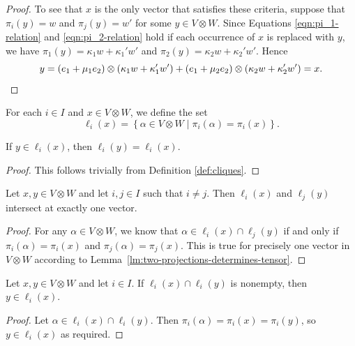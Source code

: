 \documentclass[ALCO, Unicode]{cedram}
\begin{document}
\begin{proof}
To see that $x$ is the only vector that satisfies these criteria, suppose that $\pi_i{\left(y \right)} = w$ and $\pi_j{\left(y \right)} = w'$ for some $y \in V \otimes W$. Since Equations \eqref{eqn:pi_1-relation} and \eqref{eqn:pi_2-relation} hold if each occurrence of $x$ is replaced with $y$, we have $\pi_1{\left(y \right)} = \kappa_1 w + \kappa_1' w'$ and $\pi_2{\left(y \right)} = \kappa_2 w + \kappa_2' w'$. Hence
\begin{displaymath}
    y = \left(e_1 + \mu_1 e_2 \right) \otimes \left(\kappa_1 w + \kappa_1' w' \right) + \left(e_1 + \mu_2 e_2 \right) \otimes \left(\kappa_2 w + \kappa_2' w' \right) = x.\qedhere
\end{displaymath}
\end{proof}

\begin{defi} \label{def:cliques}
For each $i \in I$ and $x \in V \otimes W$, we define the set
\begin{displaymath}
    \ell_i{\left(x \right)} = {\left\{\alpha \in V \otimes W \mid \pi_i{\left(\alpha \right)} = \pi_i{\left(x \right)}\right\}}.
\end{displaymath}
\end{defi}

\begin{lemma} \label{lm:clique-equivalence}
If $y \in \ell_i{\left(x \right)}$, then $\ell_i{\left(y \right)} = \ell_i{\left(x \right)}$.
\end{lemma}
\begin{proof}
This follows trivially from Definition \ref{def:cliques}.
\end{proof}

\begin{lemma} \label{lm:clique-intersection}
Let $x, y \in V \otimes W$ and let $i, j \in I$ such that $i \neq j$. Then $\ell_i{\left(x \right)}$ and $\ell_j{\left(y \right)}$ intersect at exactly one vector.
\end{lemma}
\begin{proof}
For any $\alpha \in V \otimes W$, we know that $\alpha \in \ell_i{\left(x \right)} \cap \ell_j{\left(y \right)}$ if and only if $\pi_i{\left(\alpha \right)} = \pi_i{\left(x \right)}$ and $\pi_j{\left(\alpha \right)} = \pi_j{\left(x \right)}$. This is true for precisely one vector in $V \otimes W$ according to Lemma~\ref{lm:two-projections-determines-tensor}.
\end{proof}

\begin{lemma} \label{lm:parallel-cliques}
Let $x, y \in V \otimes W$ and let $i \in I$. If $\ell_i{\left(x \right)} \cap \ell_i{\left(y \right)}$ is nonempty, then $y \in \ell_i{\left(x \right)}$.
\end{lemma}
\begin{proof}
Let $\alpha \in \ell_i{\left(x \right)} \cap \ell_i{\left(y \right)}$. Then $\pi_i{\left(\alpha \right)} = \pi_i{\left(x \right)} = \pi_i{\left(y \right)}$, so $y \in \ell_i{\left(x \right)}$ as required.
\end{proof}
\end{document}
